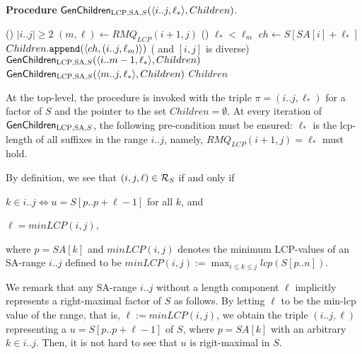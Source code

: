 \documentclass{article}
\begin{document}
{
\setlength{\algotitleheightrule}{0pt}%
\begin{algorithm}[h]
  \caption{
    \textbf{Procedure} $\textsf{GenChildren}_{{\mathrm{LCP}, \mathrm{SA}, S}}(\langle i..j, \ell_*\rangle, Children)$.  
  }\label{algo:genchildren}
      \If  ()
           {$|i..j| \ge 2$}
      {
        $(m, \ell) \gets RMQ_{LCP}(i+1, j)$
        \uIf () {$\ell_* < \ell_m$}{
          $ch \gets S[SA[i]+\ell_*]$\; 
          $Children.\mathtt{append}(\langle ch, (i..j, \ell_m)\rangle)$
        }
        \Else  ( and $[i,j]$ is diverse) 
        {
          $\textsf{GenChildren}_{{\mathrm{LCP}, \mathrm{SA}, S}}(\langle i..m-1, \ell_*\rangle, Children)$\; 
          $\textsf{GenChildren}_{{\mathrm{LCP}, \mathrm{SA}, S}}(\langle m..j, \ell_*\rangle, Children)$\;
        }
      }
      \Return $Children$\;
\end{algorithm}
}

At the top-level, the procedure is invoked with the triple $\pi = (i..j, \ell_*)$ for a factor of $S$ and the pointer to the set $Children = \emptyset$. At every iteration of $\textsf{GenChildren}_{{\mathrm{LCP}, \mathrm{SA}, S}}$, the following pre-condition must be ensured: $\ell_*$ is the lcp-length of all suffixes in the range $i..j$, namely, $RMQ_{LCP}(i+1, j) = \ell_*$ must hold.




\begin{toappendix}
By definition, we see that
$(i,j,\ell) \in \mathcal{R}_{S}$ if and only if
\begin{enumerate*}[(i)]
\item $k \in i..j \iff u = S[p..p+\ell-1]$ for all $k$, and
\item $\ell = minLCP(i,j)$,
\end{enumerate*}
where $p = SA[k]$ and $minLCP(i,j)$ denotes the minimum LCP-values of an SA-range $i..j$ defined to be $minLCP(i,j) := \max_{i\le k\le j} lcp(S[p..n])$.

\begin{remark}
  We remark that any SA-range $i..j$ without a length component $\ell$ implicitly represents a right-maximal factor of $S$ as follows. By letting $\ell$ to be the min-lcp value of the range, that is, $\ell := minLCP(i,j)$, we obtain the triple $(i..j, \ell)$ representing a $u = S[p..p+\ell-1]$ of $S$, where $p = SA[k]$ with an arbitrary $k \in i..j$. Then, it is not hard to see that $u$ is rigit-maximal in $S$.
\end{remark}
\end{toappendix}
\end{document}
